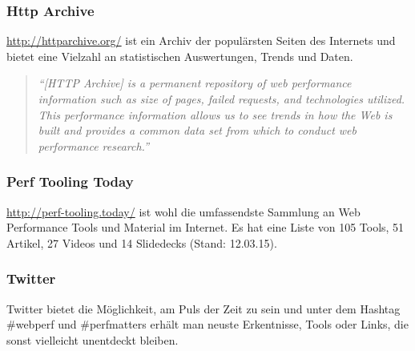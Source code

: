		\subsubsection{Http Archive} %
		\label{ssub:http_archive_bigqueri_es}
			\url{http://httparchive.org/} ist ein Archiv der populärsten Seiten des Internets und bietet eine Vielzahl an statistischen Auswertungen, Trends und Daten.
			\begin{quote}
				\textit{"`[HTTP Archive] is a permanent repository of web performance information such as size of pages, failed requests, and technologies utilized. This performance information allows us to see trends in how the Web is built and provides a common data set from which to conduct web performance research."' \autocite{httpArchiveMission}}
			\end{quote}
			

		\subsubsection{Perf Tooling Today} %
		\label{ssub:perf_tooling_today}
			\url{http://perf-tooling.today/} ist wohl die umfassendste Sammlung an Web Performance Tools und Material im Internet. Es hat eine Liste von 105 Tools, 51 Artikel, 27 Videos und 14 Slidedecks (Stand: 12.03.15).
		

		\subsubsection{Twitter} %
		\label{ssub:twitter}
			Twitter bietet die Möglichkeit, am Puls der Zeit zu sein und unter dem Hashtag \#webperf und \#perfmatters erhält man neuste Erkentnisse, Tools oder Links, die sonst vielleicht unentdeckt bleiben.
		
	\pagebreak


